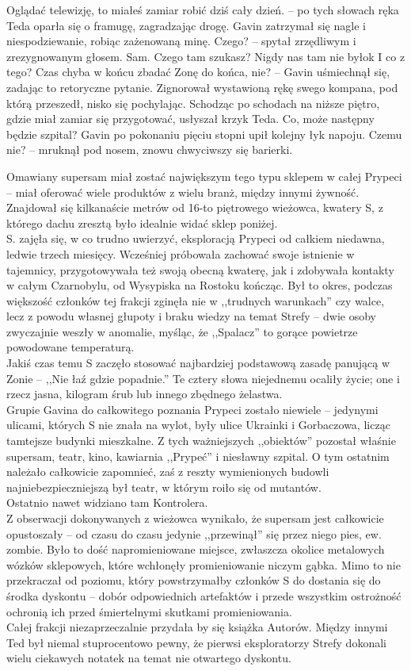 \documentclass[../MAIN.tex]{subfiles}
\begin{document}
\xx Oglądać telewizję, to miałeś zamiar robić dziś cały dzień. -- po tych słowach ręka Teda oparła się o framugę, zagradzając drogę.
\qd
Gavin zatrzymał się nagle i niespodziewanie, robiąc zażenowaną minę.
\sx Czego? -- spytał zrzędliwym i zrezygnowanym głosem.
\xx Sam. Czego tam szukasz?
\xx Nigdy nas tam nie było\3k
\xx I co z tego?
\xx Czas chyba w końcu zbadać Zonę do końca, nie? -- Gavin uśmiechnął się, zadając to retoryczne pytanie.
\qd
Zignorował wystawioną rękę swego kompana, pod którą przeszedł, nisko się pochylając. Schodząc po schodach na niższe piętro, gdzie miał zamiar się przygotować, usłyszał krzyk Teda.
\sx Co, może następny będzie szpital?
\qd
Gavin po pokonaniu pięciu stopni upił kolejny łyk napoju.
\sx Czemu nie? -- mruknął pod nosem, znowu chwyciwszy się barierki.
\qd

Omawiany supersam miał zostać największym tego typu sklepem w całej Prypeci -- miał oferować wiele produktów z wielu branż, między innymi żywność. Znajdował się kilkanaście metrów od 16-to piętrowego wieżowca, kwatery S, z którego dachu zresztą było idealnie widać sklep poniżej.\\
S. zajęła się, w co trudno uwierzyć, eksploracją Prypeci od całkiem niedawna, ledwie trzech miesięcy. Wcześniej próbowała zachować swoje istnienie w tajemnicy, przygotowywała też swoją obecną kwaterę, jak i zdobywała kontakty w całym Czarnobylu, od Wysypiska na Rostoku kończąc. Był to okres, podczas większość członków tej frakcji zginęła nie w ,,trudnych warunkach'' czy walce, lecz z powodu własnej głupoty i braku wiedzy na temat Strefy -- dwie osoby zwyczajnie weszły w anomalie, myśląc, że ,,Spalacz'' to gorące powietrze powodowane temperaturą.\\
Jakiś czas temu S zaczęło stosować najbardziej podstawową zasadę panującą w Zonie -- ,,Nie łaź gdzie popadnie.'' Te cztery słowa niejednemu ocaliły życie; one i rzecz jasna, kilogram śrub lub innego zbędnego żelastwa.\\
Grupie Gavina do całkowitego poznania Prypeci zostało niewiele -- jedynymi ulicami, których S nie znała na wylot, były ulice Ukrainki i Gorbaczowa, licząc tamtejsze budynki mieszkalne. Z tych ważniejszych ,,obiektów'' pozostał właśnie supersam, teatr, kino, kawiarnia ,,Prypeć'' i niesławny szpital. O tym ostatnim należało całkowicie zapomnieć, zaś z reszty wymienionych budowli najniebezpieczniejszą był teatr, w którym roiło się od mutantów.\\
Ostatnio nawet widziano tam Kontrolera.\\
Z obserwacji dokonywanych z wieżowca wynikało, że supersam jest całkowicie opustoszały -- od czasu do czasu jedynie ,,przewinął'' się przez niego pies, ew. zombie. Było to dość napromieniowane miejsce, zwłaszcza okolice metalowych wózków sklepowych, które wchłonęły promieniowanie niczym gąbka. Mimo to nie przekraczał od poziomu, który powstrzymałby członków S do dostania się do środka dyskontu -- dobór odpowiednich artefaktów i przede wszystkim ostrożność ochronią ich przed śmiertelnymi skutkami promieniowania.\\
Całej frakcji niezaprzeczalnie przydała by się książka Autorów. Między innymi Ted był niemal stuprocentowo pewny, że pierwsi eksploratorzy Strefy dokonali wielu ciekawych notatek na temat nie otwartego dyskontu.
\end{document}
